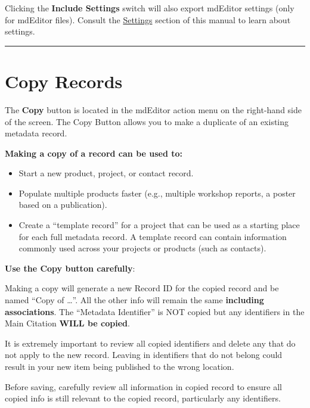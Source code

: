 \documentclass[
]{book}
\makeatletter
\providecommand{\tightlist}{%
  \setlength{\itemsep}{0pt}\setlength{\parskip}{0pt}}
\newenvironment{kframe}{%
\medskip{}
\setlength{\fboxsep}{.8em}
 \def\at@end@of@kframe{}%
 \ifinner\ifhmode%
  \def\at@end@of@kframe{\end{minipage}}%
  \begin{minipage}{\columnwidth}%
 \fi\fi%
 \def\FrameCommand##1{\hskip\@totalleftmargin \hskip-\fboxsep
 \colorbox{shadecolor}{##1}\hskip-\fboxsep
     \hskip-\linewidth \hskip-\@totalleftmargin \hskip\columnwidth}%
 \MakeFramed {\advance\hsize-\width
   \@totalleftmargin\z@ \linewidth\hsize
   \@setminipage}}%
 {\par\unskip\endMakeFramed%
 \at@end@of@kframe}
\newenvironment{rmdblock}[1]
  {
  \begin{itemize}
  \renewcommand{\labelitemi}{
    \raisebox{-.7\height}[0pt][0pt]{
      {\setkeys{Gin}{width=3em,keepaspectratio}\texttt{[image: images/\#1]}}
    }
  }
  \setlength{\fboxsep}{1em}
  \begin{kframe}
  \item
  }
  {
  \end{kframe}
  \end{itemize}
  }
\newenvironment{rmdwarning}
  {\begin{rmdblock}{warning}}
  {\end{rmdblock}}
\makeatother
\begin{document}
Clicking the \textbf{Include Settings} switch will also export mdEditor settings (only for mdEditor files). Consult the \protect\hyperlink{settings}{Settings} section of this manual to learn about settings.

\begin{center}\rule{0.5\linewidth}{\linethickness}\end{center}

\hypertarget{copy-records}{%
\section{Copy Records}\label{copy-records}}

The \textbf{Copy} button is located in the mdEditor action menu on the right-hand side of the screen. The Copy Button allows you to make a duplicate of an existing metadata record.

\textbf{Making a copy of a record can be used to:}

\begin{itemize}
\tightlist
\item
  Start a new product, project, or contact record.
\item
  Populate multiple products faster (e.g., multiple workshop reports, a poster based on a publication).
\item
  Create a ``template record'' for a project that can be used as a starting place for each full metadata record. A template record can contain information commonly used across your projects or products (such as contacts).
\end{itemize}

\textbf{Use the Copy button carefully}:

Making a copy will generate a new Record ID for the copied record and be named ``Copy of \ldots{}''. All the other info will remain the same \textbf{including associations}. The ``Metadata Identifier'' is NOT copied but any identifiers in the Main Citation \textbf{WILL be copied}.

\begin{rmdwarning}
It is extremely important to review all copied identifiers and delete
any that do not apply to the new record. Leaving in identifiers that do
not belong could result in your new item being published to the wrong
location.
\end{rmdwarning}

Before saving, carefully review all information in copied record to ensure all copied info is still relevant to the copied record, particularly any identifiers.
\end{document}
